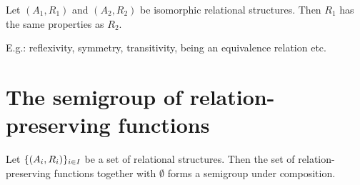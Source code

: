 \begin{lemma}
Let $(A_1, R_1)$ and $(A_2, R_2)$ be isomorphic relational structures. Then $R_1$ has the same properties as $R_2$.
\end{lemma}
E.g.: reflexivity, symmetry, transitivity, being an equivalence relation etc.


\section{The semigroup of relation-preserving functions}
\begin{lemma}
Let $\{\left( A_i, R_i \right)\}_{i\in I}$ be a set of relational structures. Then the set of relation-preserving functions together with $\emptyset$ forms a semigroup under composition.
\end{lemma}



